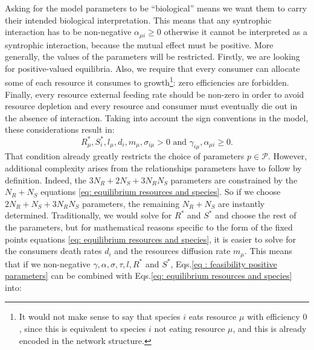 \documentclass[12pt, titlepage]{report}
\begin{document}
Asking for the model parameters to be ``biological'' means we want them to carry their intended biological interpretation. This means \eg that any syntrophic interaction has to be non-negative $\alpha_{\mu i} \geq 0 $ otherwise it cannot be interpreted as a syntrophic interaction, because the mutual effect must be positive. More generally, the values of the parameters will be restricted.
Firstly, we are looking for positive-valued equilibria. %
Also, we require that every consumer can allocate some of each resource it consumes to growth\footnote{It would not make sense to say that species $i$ eats resource $\mu$ with efficiency $0$, since this is equivalent to species $i$ not eating resource $\mu$, and this is already encoded in the network structure.}: zero efficiencies are forbidden. Finally, every resource external feeding rate should be non-zero in order to avoid resource depletion and every resource and consumer must eventually die out in the absence of interaction. Taking into account the sign conventions in the model, these considerations result in:
\begin{equation}
{
R^*_\mu, S^*_i, l_\mu, d_i, m_\mu, \sigma_{i\mu} > 0 \text { and } \gamma_{i\mu}, \alpha_{\mu i} \geq 0.
}
\label{eq : feasibility positive parameters}
\end{equation}
That condition already greatly restricts the choice of parameters $p\in \mathcal{P}$. However, additional complexity arises from the relationships parameters have to follow by definition. Indeed, the $3 N_R +2 N_S + 3 N_R N_S $ parameters are constrained by the $N_R + N_S $ equations \eqref{eq: equilibrium resources and species}. So if we choose $2 N_R + N_S + 3 N_R N_S$ parameters, the remaining $N_R + N_S$ are instantly determined. Traditionally, we would solve for $R^*$ and $S^*$ and choose the rest of the parameters, but for mathematical reasons specific to the form of the fixed points equations \eqref{eq: equilibrium resources and species}, it is easier to solve for the consumers death rates $d_i$ and the resources diffusion rate $m_\mu$. This means that if we  non-negative $\gamma, \alpha, \sigma, \tau, l, R^*$ and $S^*$, Eqs.\eqref{eq : feasibility positive parameters} can be combined with Eqs.\eqref{eq: equilibrium resources and species} into:
\end{document}
